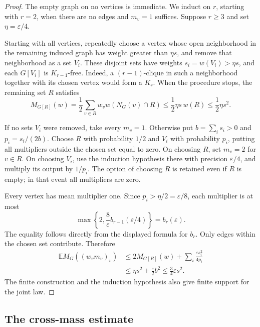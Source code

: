 \begin{proof}
The empty graph on no vertices is immediate.  We induct on $r$, starting
with $r=2$, when there are no edges and $m_v=1$ suffices.  Suppose $r\ge3$
and set $\eta=\varepsilon/4$.

Starting with all vertices, repeatedly choose a vertex whose open
neighborhood in the remaining induced graph has weight greater than
$\eta s$, and remove that neighborhood as a set $V_i$.  These disjoint
sets have weights $s_i=w(V_i)>\eta s$, and each $G[V_i]$ is
$K_{r-1}$-free.  Indeed, a $(r-1)$-clique in such a neighborhood together
with its chosen vertex would form a $K_r$.  When the procedure stops,
the remaining set $R$ satisfies
\begin{equation}\label{eq:remainder-mass}
 M_{G[R]}(w)
 =\frac12\sum_{v\in R}w_vw(N_G(v)\cap R)
 \le\frac12\eta s\,w(R)\le\frac12\eta s^2.
\end{equation}

If no sets $V_i$ were removed, take every $m_v=1$.  Otherwise put
$b=\sum_i s_i>0$ and $p_i=s_i/(2b)$.  Choose $R$ with probability $1/2$
and $V_i$ with probability $p_i$, putting all multipliers outside the
chosen set equal to zero.  On choosing $R$, set $m_v=2$ for $v\in R$.
On choosing $V_i$, use the induction hypothesis there with precision
$\varepsilon/4$, and multiply its output by $1/p_i$.
The option of choosing $R$ is retained even if $R$ is empty; in that
event all multipliers are zero.

Every vertex has mean multiplier one.  Since
$p_i>\eta/2=\varepsilon/8$, each multiplier is at most
\[
 \max\left\{2,\frac8\varepsilon
                    b_{r-1}(\varepsilon/4)\right\}
 = b_r(\varepsilon).
\]
The equality follows directly from the displayed formula for $b_r$.
Only edges within the chosen set contribute.  Therefore
\begin{align*}
 \mathbb E M_G((w_vm_v)_v)
 &\le 2M_{G[R]}(w)
       +\sum_i\frac{\varepsilon s_i^2}{4p_i}\\
 &\le \eta s^2+\frac{\varepsilon}{2}b^2
 \le\frac34\varepsilon s^2.
\end{align*}
The finite construction and the induction hypothesis also give finite
support for the joint law.
\end{proof}

\subsection{The cross-mass estimate}

